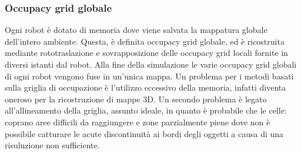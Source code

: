 \subsubsection{Occupacy grid globale}
\label{ssec:globaloccgrid}
Ogni robot è dotato di memoria dove viene salvata la mappatura globale
dell'intero ambiente. Questa, è definita occupacy grid globale, ed è ricostruita
mediante rototraslazione e sovrapposizione delle occupacy grid locali
fornite in diversi istanti dal robot.
Alla fine della simulazione le varie occupacy grid globali di ogni robot vengono
fuse in un'unica mappa.
Un problema per i metodi basati sulla griglia di occupazione è l'utilizzo
eccessivo della memoria, infatti diventa oneroso per la ricostruzione di mappe
3D.
Un secondo problema è legato all'allineamento della griglia, assunto ideale, in
quanto è probabile che le celle: coprano aree difficili da raggiungere e zone
parzialmente piene dove non è possibile catturare le acute discontinuità ai
bordi degli oggetti a causa di una risuluzione non sufficiente.
